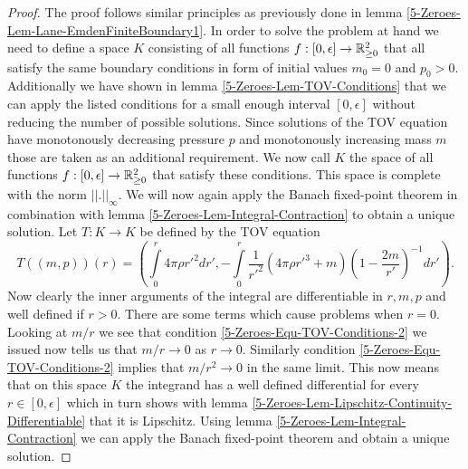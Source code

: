 \begin{proof}
	The proof follows similar principles as previously done in lemma \ref{5-Zeroes-Lem-Lane-EmdenFiniteBoundary1}.
	In order to solve the problem at hand we need to define a space $K$ consisting of all functions $f:[0,\epsilon]\rightarrow\mathbb{R}_{\geq0}^2$ that all satisfy the same boundary conditions in form of initial values $m_0=0$ and $p_0>0$.
	Additionally we have shown in lemma \ref{5-Zeroes-Lem-TOV-Conditions} that we can apply the listed conditions for a small enough interval $[0,\epsilon]$ without reducing the number of possible solutions.
	Since solutions of the \ac{TOV} equation have monotonously decreasing pressure $p$ and monotonously increasing mass $m$ those are taken as an additional requirement.
	We now call $K$ the space of all functions $f:[0,\epsilon]\rightarrow\mathbb{R}_{\geq0}^2$ that satisfy these conditions.
	This space is complete with the norm $||.||_\infty$.
	We will now again apply the Banach fixed-point theorem in combination with lemma \ref{5-Zeroes-Lem-Integral-Contraction} to obtain a unique solution.
	Let $T:K\rightarrow K$ be defined by the \ac{TOV} equation
	\begin{equation}
		T((m,p))(r)=\left(\int\limits_0^r 4\pi\rho r'^2dr',-\int\limits_0^r\frac{1}{r'^2}(4\pi\rho r'^3 + m)\left(1-\frac{2m}{r'}\right)^{-1}dr'\right).
	\end{equation}
	Now clearly the inner arguments of the integral are differentiable in $r,m,p$ and well defined if $r>0$.
	There are some terms which cause problems when $r=0$.
	Looking at $m/r$ we see that condition \eqref{5-Zeroes-Equ-TOV-Conditions-2} we issued now tells us that $m/r\rightarrow0$ as $r\rightarrow0$.
	Similarly condition \eqref{5-Zeroes-Equ-TOV-Conditions-2} implies that $m/r^2\rightarrow0$ in the same limit.
	This now means that on this space $K$ the integrand has a well defined differential for every $r\in[0,\epsilon]$ which in turn shows with lemma \ref{5-Zeroes-Lem-Lipschitz-Continuity-Differentiable} that it is Lipschitz.
	Using lemma \ref{5-Zeroes-Lem-Integral-Contraction} we can apply the Banach fixed-point theorem and obtain a unique solution.
\end{proof}
%
%
%
